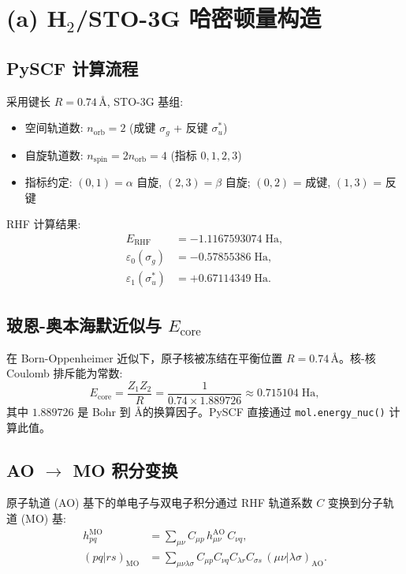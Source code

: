 \documentclass[fontset=mac]{ctexart}
\begin{document}
\section*{(a) H$_2$/STO-3G 哈密顿量构造}

\subsection*{PySCF 计算流程}

采用键长 $R=0.74$\,\AA, STO-3G 基组:
\begin{itemize}
    \item 空间轨道数: $n_{\text{orb}}=2$ (成键 $\sigma_g$ + 反键 $\sigma_u^*$)
    \item 自旋轨道数: $n_{\text{spin}}=2n_{\text{orb}}=4$ (指标 $0,1,2,3$)
    \item 指标约定: $(0,1)=\alpha$ 自旋, $(2,3)=\beta$ 自旋; $(0,2)$ = 成键, $(1,3)$ = 反键
\end{itemize}

RHF 计算结果:
\begin{align*}
    E_{\text{RHF}} &= -1.1167593074\;\text{Ha}, \\
    \varepsilon_0(\sigma_g) &= -0.57855386\;\text{Ha}, \\
    \varepsilon_1(\sigma_u^*) &= +0.67114349\;\text{Ha}.
\end{align*}

\subsection*{玻恩-奥本海默近似与 $E_{\text{core}}$}

在 Born-Oppenheimer 近似下，原子核被冻结在平衡位置 $R=0.74$\,\AA。核-核 Coulomb 排斥能为常数:
\begin{equation}
    E_{\text{core}} = \frac{Z_1 Z_2}{R} = \frac{1}{0.74 \times 1.889726} \approx 0.715104\;\text{Ha},
\end{equation}
其中 $1.889726$ 是 Bohr 到 \AA 的换算因子。PySCF 直接通过 \texttt{mol.energy\_nuc()} 计算此值。

\subsection*{AO $\to$ MO 积分变换}

原子轨道 (AO) 基下的单电子与双电子积分通过 RHF 轨道系数 $C$ 变换到分子轨道 (MO) 基:
\begin{align}
    h_{pq}^{\text{MO}} &= \sum_{\mu\nu} C_{\mu p} \, h_{\mu\nu}^{\text{AO}} \, C_{\nu q}, \\
    (pq|rs)_{\text{MO}} &= \sum_{\mu\nu\lambda\sigma} C_{\mu p} C_{\nu q} C_{\lambda r} C_{\sigma s} \, (\mu\nu|\lambda\sigma)_{\text{AO}}.
\end{align}
\end{document}
